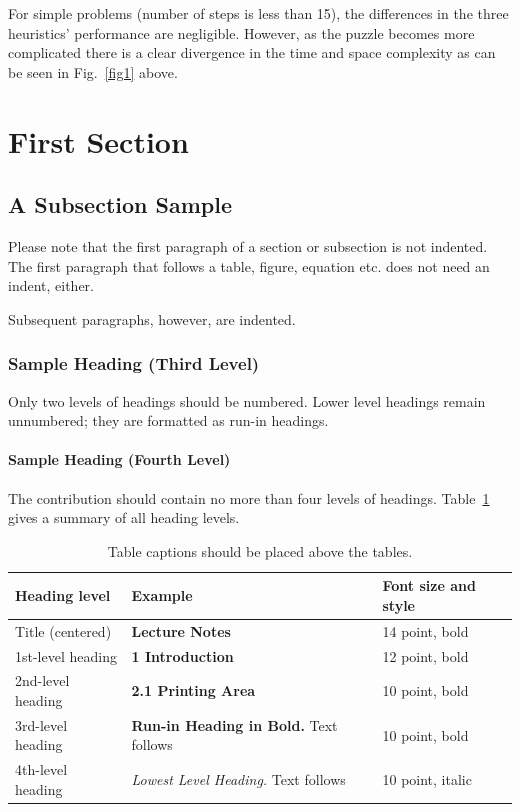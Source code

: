 \documentclass[runningheads]{llncs}
\begin{document}
For simple problems (number of steps is less than 15), the differences in the three heuristics' performance are negligible. However, as the puzzle becomes more complicated there is a clear divergence in the time and space complexity as can be seen in Fig.~\ref{fig1} above.

\section{First Section}
\subsection{A Subsection Sample}
Please note that the first paragraph of a section or subsection is
not indented. The first paragraph that follows a table, figure,
equation etc. does not need an indent, either.

Subsequent paragraphs, however, are indented.

\subsubsection{Sample Heading (Third Level)} Only two levels of
headings should be numbered. Lower level headings remain unnumbered;
they are formatted as run-in headings.

\paragraph{Sample Heading (Fourth Level)}
The contribution should contain no more than four levels of
headings. Table~\ref{tab1} gives a summary of all heading levels.

\begin{table}
\caption{Table captions should be placed above the
tables.}\label{tab1}
\begin{tabular}{|l|l|l|}
\hline
Heading level &  Example & Font size and style\\
\hline
Title (centered) &  {\Large\bfseries Lecture Notes} & 14 point, bold\\
1st-level heading &  {\large\bfseries 1 Introduction} & 12 point, bold\\
2nd-level heading & {\bfseries 2.1 Printing Area} & 10 point, bold\\
3rd-level heading & {\bfseries Run-in Heading in Bold.} Text follows & 10 point, bold\\
4th-level heading & {\itshape Lowest Level Heading.} Text follows & 10 point, italic\\
\hline
\end{tabular}
\end{table}
\end{document}
